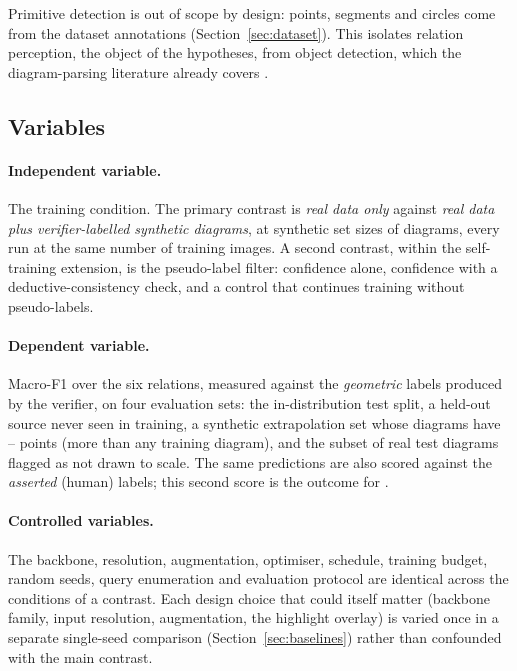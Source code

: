 Primitive detection is out of scope by design: points, segments and circles come from the dataset annotations (Section~\ref{sec:dataset}). This isolates relation perception, the object of the hypotheses, from object detection, which the diagram-parsing literature already covers \cite{zhang2022pgdp}.

\subsection{Variables}

\paragraph{Independent variable.} The training condition. The primary contrast is \emph{real data only} against \emph{real data plus verifier-labelled synthetic diagrams}, at synthetic set sizes of \scalingSizes{} diagrams, every run at the same number of training images. A second contrast, within the self-training extension, is the pseudo-label filter: confidence alone, confidence with a deductive-consistency check, and a control that continues training without pseudo-labels.

\paragraph{Dependent variable.} Macro-F1 over the six relations, measured against the \emph{geometric} labels produced by the verifier, on four evaluation sets: the in-distribution test split, a held-out source never seen in training, a synthetic extrapolation set whose diagrams have \synthExtrapPointsMin--\synthExtrapPointsMax{} points (more than any training diagram), and the subset of real test diagrams flagged as not drawn to scale. The same predictions are also scored against the \emph{asserted} (human) labels; this second score is the outcome for \Htwo.

\paragraph{Controlled variables.} The backbone, resolution, augmentation, optimiser, schedule, training budget, random seeds, query enumeration and evaluation protocol are identical across the conditions of a contrast. Each design choice that could itself matter (backbone family, input resolution, augmentation, the highlight overlay) is varied once in a separate single-seed comparison (Section~\ref{sec:baselines}) rather than confounded with the main contrast.


